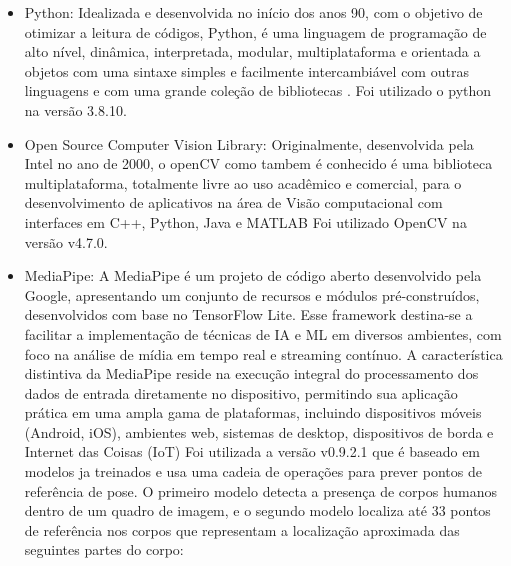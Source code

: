 \begin{itemize}




   \item Python: Idealizada e desenvolvida no início dos anos 90,  com o objetivo de otimizar a leitura de códigos, Python, é uma linguagem de programação de alto nível, dinâmica, interpretada, modular, multiplataforma e orientada a objetos com uma sintaxe simples e facilmente intercambiável com outras linguagens e com uma grande coleção de bibliotecas \cite{python}. Foi utilizado o python na versão 3.8.10.

   \item Open Source Computer Vision Library: Originalmente, desenvolvida pela Intel no ano de 2000, o openCV como tambem é conhecido é  uma biblioteca multiplataforma, totalmente livre ao uso acadêmico e comercial, para o desenvolvimento de aplicativos na área de Visão computacional com interfaces em C++, Python, Java e MATLAB \cite{openCV} Foi utilizado OpenCV na versão v4.7.0.
   
   \item MediaPipe: A MediaPipe é um projeto de código aberto desenvolvido pela Google, apresentando um conjunto de recursos e módulos pré-construídos, desenvolvidos com base no TensorFlow Lite. Esse framework destina-se a facilitar a implementação de técnicas de \ac{IA} e \ac{ML} em diversos ambientes, com foco na análise de mídia em tempo real e streaming contínuo. A característica distintiva da MediaPipe reside na execução integral do processamento dos dados de entrada diretamente no dispositivo, permitindo sua aplicação prática em uma ampla gama de plataformas, incluindo dispositivos móveis (Android, iOS), ambientes web, sistemas de desktop, dispositivos de borda e Internet das Coisas (IoT)\cite{mediapipe} Foi utilizada a versão v0.9.2.1 que é baseado em modelos ja treinados e usa uma cadeia de operações para prever pontos de referência de pose. O primeiro modelo detecta a presença de corpos humanos dentro de um quadro de imagem, e o segundo modelo localiza até 33 pontos de referência nos corpos \cite{mediapipe_pose_landmarker} que representam a localização aproximada das seguintes partes do corpo:



\end{itemize}
